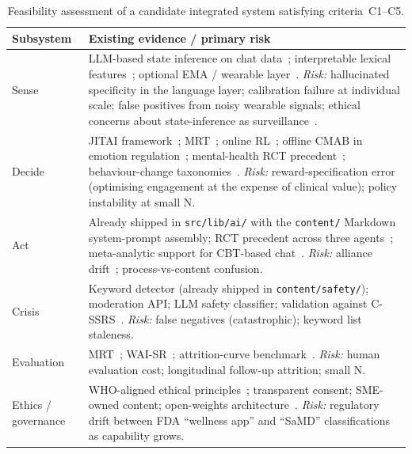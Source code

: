 \documentclass[10pt,conference]{article}
\begin{document}
\begin{table}[t]
\small
\begin{tabularx}{\textwidth}{l X}
\toprule
\textbf{Subsystem} & \textbf{Existing evidence / primary risk} \\
\midrule
Sense & LLM-based state inference on chat
data~\cite{Xu2024MentalLLM,Stade2024LLMOppRisks}; interpretable lexical
features~\cite{Walker2024InstagramSuicideLIWC,Boettcher2021RedditMHReview};
optional EMA / wearable layer~\cite{Trull2009ESMEMA,Versluis2016EMI,Sequeira2021PassiveSensing,Laborde2017HRV}. \emph{Risk:}
hallucinated specificity in the language layer; calibration failure at
individual scale; false positives from noisy wearable signals; ethical
concerns about state-inference as surveillance~\cite{BirkSamuel2020DigitalPhenotypingCritique}. \\
Decide & JITAI framework~\cite{NahumShani2018JITAI};
MRT~\cite{Klasnja2015MRT,Liao2016MRTSampleSize};
online RL~\cite{Liao2020PersonalizedHeartSteps};
offline CMAB in emotion regulation~\cite{Ameko2020CMABEmotion};
mental-health RCT
precedent~\cite{Aguilera2024DIAMANTERL}; behaviour-change
taxonomies~\cite{Michie2011BCW,Michie2013BCTTaxonomy}. \emph{Risk:}
reward-specification error (optimising engagement
at the expense of clinical value); policy instability at small N. \\
Act & Already shipped in \texttt{src/lib/ai/} with
the \texttt{content/} Markdown system-prompt assembly; RCT precedent
across three agents~\cite{Fitzpatrick2017Woebot,Inkster2018Wysa,Heinz2025TherabotRCT};
meta-analytic support for CBT-based chat~\cite{Linardon2019Meta}.
\emph{Risk:} alliance drift~\cite{Henson2019DTA,MalouinLachance2025DTAReview};
process-vs-content confusion. \\
Crisis & Keyword detector (already shipped in \texttt{content/safety/});
moderation API; LLM safety classifier; validation against
C-SSRS~\cite{Posner2011CSSRS}. \emph{Risk:} false negatives (catastrophic);
keyword list staleness. \\
Evaluation & MRT~\cite{Klasnja2015MRT,Liao2016MRTSampleSize,Luers2018StandardizedEffect,Seewald2019MRTData};
WAI-SR~\cite{Hatcher2006WAISR};
attrition-curve benchmark~\cite{Linardon2020Attrition}. \emph{Risk:}
human evaluation cost; longitudinal follow-up attrition; small N. \\
Ethics / governance & WHO-aligned ethical principles~\cite{MartinezMartin2021DigitalPhenotypingEthics,MartinezMartin2020COVIDDigitalMHEthics};
transparent consent; SME-owned content;
open-weights architecture~\cite{vanHeerden2023LLMGlobalMH}. \emph{Risk:} regulatory drift
between FDA ``wellness app'' and ``SaMD'' classifications as capability
grows. \\
\bottomrule
\end{tabularx}
\caption{Feasibility assessment of a candidate integrated system satisfying criteria~C1--C5.}
\label{tab:feasibility}
\end{table}
\end{document}
